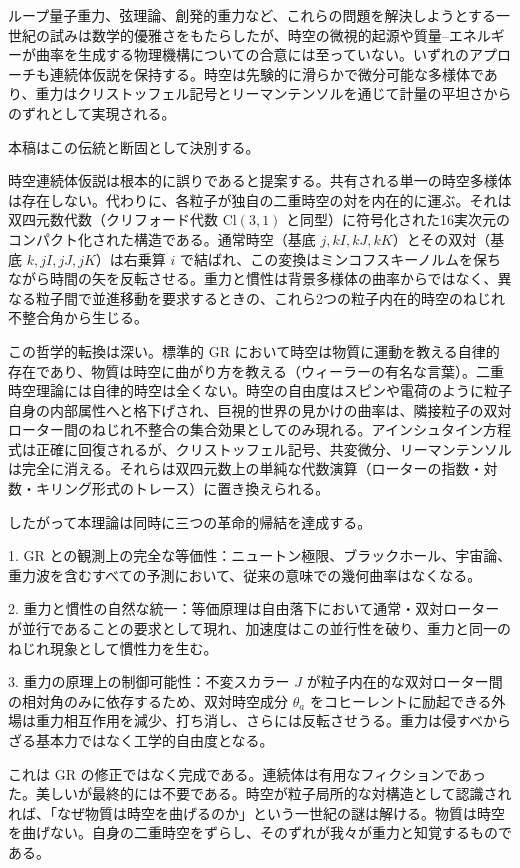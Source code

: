 \documentclass[a4paper]{article}
\begin{document}
ループ量子重力、弦理論、創発的重力など、これらの問題を解決しようとする一世紀の試みは数学的優雅さをもたらしたが、時空の微視的起源や質量--エネルギーが曲率を生成する物理機構についての合意には至っていない。いずれのアプローチも連続体仮説を保持する。時空は先験的に滑らかで微分可能な多様体であり、重力はクリストッフェル記号とリーマンテンソルを通じて計量の平坦さからのずれとして実現される。

本稿はこの伝統と断固として決別する。

時空連続体仮説は根本的に誤りであると提案する。共有される単一の時空多様体は存在しない。代わりに、各粒子が独自の二重時空の対を内在的に運ぶ。それは双四元数代数（クリフォード代数 $\mathrm{Cl}(3,1)$ と同型）に符号化された16実次元のコンパクト化された構造である。通常時空（基底 $j, kI, kJ, kK$）とその双対（基底 $k, jI, jJ, jK$）は右乗算 $i$ で結ばれ、この変換はミンコフスキーノルムを保ちながら時間の矢を反転させる。重力と慣性は背景多様体の曲率からではなく、異なる粒子間で並進移動を要求するときの、これら2つの粒子内在的時空のねじれ不整合角から生じる。

この哲学的転換は深い。標準的 GR において時空は物質に運動を教える自律的存在であり、物質は時空に曲がり方を教える（ウィーラーの有名な言葉）。二重時空理論には自律的時空は全くない。時空の自由度はスピンや電荷のように粒子自身の内部属性へと格下げされ、巨視的世界の見かけの曲率は、隣接粒子の双対ローター間のねじれ不整合の集合効果としてのみ現れる。アインシュタイン方程式は正確に回復されるが、クリストッフェル記号、共変微分、リーマンテンソルは完全に消える。それらは双四元数上の単純な代数演算（ローターの指数・対数・キリング形式のトレース）に置き換えられる。

したがって本理論は同時に三つの革命的帰結を達成する。

1. GR との観測上の完全な等価性：ニュートン極限、ブラックホール、宇宙論、重力波を含むすべての予測において、従来の意味での幾何曲率はなくなる。

2. 重力と慣性の自然な統一：等価原理は自由落下において通常・双対ローターが並行であることの要求として現れ、加速度はこの並行性を破り、重力と同一のねじれ現象として慣性力を生む。

3. 重力の原理上の制御可能性：不変スカラー $J$ が粒子内在的な双対ローター間の相対角のみに依存するため、双対時空成分 $\theta_a$ をコヒーレントに励起できる外場は重力相互作用を減少、打ち消し、さらには反転させうる。重力は侵すべからざる基本力ではなく工学的自由度となる。

これは GR の修正ではなく完成である。連続体は有用なフィクションであった。美しいが最終的には不要である。時空が粒子局所的な対構造として認識されれば、「なぜ物質は時空を曲げるのか」という一世紀の謎は解ける。物質は時空を曲げない。自身の二重時空をずらし、そのずれが我々が重力と知覚するものである。
\end{document}
